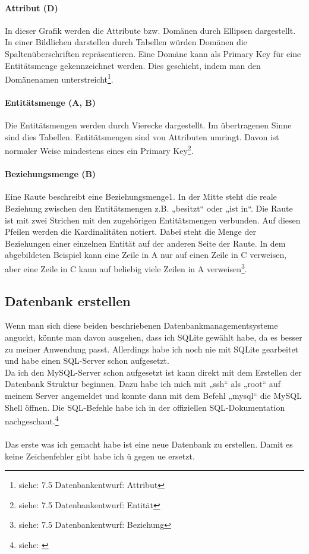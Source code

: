 \documentclass[a4paper, 12pt]{article}
\theoremstyle{plain}
\theoremstyle{definition}
\begin{document}
	\paragraph{Attribut (D)} In dieser Grafik werden die Attribute bzw. Domänen durch Ellipsen dargestellt. In einer Bildlichen darstellen durch Tabellen würden Domänen die Spaltenüberschriften repräsentieren. Eine Domäne kann als Primary Key für eine Entitätsmenge gekennzeichnet werden. Dies geschieht, indem man den Domänenamen unterstreicht\footnote{siehe: \cite{Jarosch2010} 7.5 Datenbankentwurf: Attribut}.
	
	\paragraph{Entitätsmenge (A, B)} Die Entitätsmengen werden durch Vierecke dargestellt. Im übertragenen Sinne sind dies Tabellen. Entitätsmengen sind von Attributen umringt. Davon ist normaler Weise mindestens eines ein Primary Key\footnote{siehe: \cite{Jarosch2010} 7.5 Datenbankentwurf: Entität}.
	
	\paragraph{Beziehungsmenge (B)} Eine Raute beschreibt eine Beziehungsmenge1. In der Mitte steht die reale Beziehung zwischen den Entitätsmengen z.B. „besitzt“ oder „ist in“. Die Raute ist mit zwei Strichen mit den zugehörigen Entitätsmengen verbunden.  Auf diesen Pfeilen werden die Kardinalitäten notiert. Dabei steht die Menge der Beziehungen einer einzelnen Entität auf der anderen Seite der Raute. In dem abgebildeten Beispiel kann eine Zeile in A nur auf einen Zeile in C verweisen, aber eine Zeile in C kann auf beliebig viele Zeilen in A verweisen\footnote{siehe: \cite{Jarosch2010} 7.5 Datenbankentwurf: Beziehung}. 
	
	\subsection{Datenbank erstellen}
	\label{sec:dbErst}
	
	Wenn man sich diese beiden beschriebenen Datenbankmanagementsysteme anguckt, könnte man davon ausgehen, dass ich SQLite gewählt habe, da es besser zu meiner Anwendung passt. Allerdings habe ich noch nie mit SQLite gearbeitet und habe einen SQL-Server schon aufgesetzt.\\
Da ich den MySQL-Server schon aufgesetzt ist kann direkt mit dem Erstellen der Datenbank Struktur beginnen. Dazu habe ich mich mit „ssh“ als „root“ auf meinem Server angemeldet und konnte dann mit dem Befehl „mysql“ die MySQL Shell öffnen. Die SQL-Befehle habe ich in der offiziellen SQL-Dokumentation nachgeschaut.\footnote{siehe: \cite{sqlDocu}}\\ \\
Das erste was ich gemacht habe ist eine neue Datenbank zu erstellen. Damit es keine Zeichenfehler gibt habe ich ü gegen ue ersetzt.
	
\end{document}
